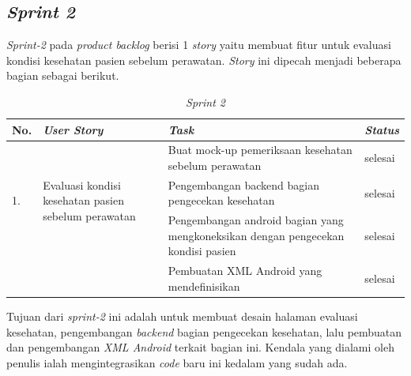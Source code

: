 \subsection{\textit{Sprint 2}}
\textit{Sprint-2} pada \textit{product backlog} berisi 1 \textit{story} yaitu membuat fitur untuk evaluasi kondisi kesehatan pasien sebelum perawatan. \textit{Story} ini dipecah menjadi beberapa bagian sebagai berikut.

\begin{table}[H]
	\caption{\textit{Sprint 2}}
	\label{sprint2_backlog}
	\begin{tabular}{@{} |p{0.5cm}|p{5cm}|p{5cm}|p{2cm}| @{}}
		\hline
		\textbf{No.} & \textbf{\textit{User Story}} & \textbf{\textit{Task}} & \textbf{\textit{Status}} \\
		\hline
		\multirow{3}{3cm}{1.} & \multirow{3}{5cm}{Evaluasi kondisi kesehatan pasien sebelum perawatan} & Buat mock-up pemeriksaan kesehatan sebelum perawatan & selesai\\
		\cline{3-4}
		 & & Pengembangan backend bagian pengecekan kesehatan & selesai\\
		\cline{3-4}
		 & & Pengembangan android bagian yang mengkoneksikan dengan pengecekan kondisi pasien & selesai\\
		\cline{3-4}
		 & & Pembuatan XML Android yang mendefinisikan & selesai\\
		\hline
	\end{tabular}
	\end{table}
	
	Tujuan dari \textit{sprint-2} ini adalah untuk membuat desain halaman evaluasi kesehatan, pengembangan \textit{backend} bagian pengecekan kesehatan, lalu pembuatan dan pengembangan \textit{XML Android} terkait bagian ini. Kendala yang dialami oleh penulis ialah mengintegrasikan \textit{code} baru ini kedalam yang sudah ada.
	
